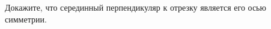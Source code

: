 \begin{ex}
	\begin{condition}
		Докажите, что серединный перпендикуляр к отрезку является его осью симметрии.
	\end{condition}
\end{ex}